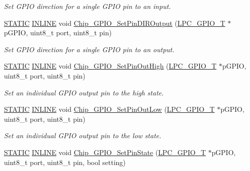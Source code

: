 \begin{DoxyCompactItemize}
\begin{DoxyCompactList}\small\item\em Set G\+P\+IO direction for a single G\+P\+IO pin to an input. \end{DoxyCompactList}\item 
\hyperlink{group__LPC__Types__Public__Macros_ga10b2d890d871e1489bb02b7e70d9bdfb}{S\+T\+A\+T\+IC} \hyperlink{group__LPC__Types__Public__Types_ga2eb6f9e0395b47b8d5e3eeae4fe0c116}{I\+N\+L\+I\+NE} void \hyperlink{group__GPIO__17XX__40XX_gadd0450341df62f7e13ee57cd249fe2a2}{Chip\+\_\+\+G\+P\+I\+O\+\_\+\+Set\+Pin\+D\+I\+R\+Output} (\hyperlink{structLPC__GPIO__T}{L\+P\+C\+\_\+\+G\+P\+I\+O\+\_\+T} $\ast$p\+G\+P\+IO, uint8\+\_\+t port, uint8\+\_\+t pin)
\begin{DoxyCompactList}\small\item\em Set G\+P\+IO direction for a single G\+P\+IO pin to an output. \end{DoxyCompactList}\item 
\hyperlink{group__LPC__Types__Public__Macros_ga10b2d890d871e1489bb02b7e70d9bdfb}{S\+T\+A\+T\+IC} \hyperlink{group__LPC__Types__Public__Types_ga2eb6f9e0395b47b8d5e3eeae4fe0c116}{I\+N\+L\+I\+NE} void \hyperlink{group__GPIO__17XX__40XX_ga1447549f6e88a29b5589326f177d4a96}{Chip\+\_\+\+G\+P\+I\+O\+\_\+\+Set\+Pin\+Out\+High} (\hyperlink{structLPC__GPIO__T}{L\+P\+C\+\_\+\+G\+P\+I\+O\+\_\+T} $\ast$p\+G\+P\+IO, uint8\+\_\+t port, uint8\+\_\+t pin)
\begin{DoxyCompactList}\small\item\em Set an individual G\+P\+IO output pin to the high state. \end{DoxyCompactList}\item 
\hyperlink{group__LPC__Types__Public__Macros_ga10b2d890d871e1489bb02b7e70d9bdfb}{S\+T\+A\+T\+IC} \hyperlink{group__LPC__Types__Public__Types_ga2eb6f9e0395b47b8d5e3eeae4fe0c116}{I\+N\+L\+I\+NE} void \hyperlink{group__GPIO__17XX__40XX_ga0e06760450b8e7a2c71920b06bcd6286}{Chip\+\_\+\+G\+P\+I\+O\+\_\+\+Set\+Pin\+Out\+Low} (\hyperlink{structLPC__GPIO__T}{L\+P\+C\+\_\+\+G\+P\+I\+O\+\_\+T} $\ast$p\+G\+P\+IO, uint8\+\_\+t port, uint8\+\_\+t pin)
\begin{DoxyCompactList}\small\item\em Set an individual G\+P\+IO output pin to the low state. \end{DoxyCompactList}\item 
\hyperlink{group__LPC__Types__Public__Macros_ga10b2d890d871e1489bb02b7e70d9bdfb}{S\+T\+A\+T\+IC} \hyperlink{group__LPC__Types__Public__Types_ga2eb6f9e0395b47b8d5e3eeae4fe0c116}{I\+N\+L\+I\+NE} void \hyperlink{group__GPIO__17XX__40XX_ga2d8db9f0a52f061d64e8cada713ae03e}{Chip\+\_\+\+G\+P\+I\+O\+\_\+\+Set\+Pin\+State} (\hyperlink{structLPC__GPIO__T}{L\+P\+C\+\_\+\+G\+P\+I\+O\+\_\+T} $\ast$p\+G\+P\+IO, uint8\+\_\+t port, uint8\+\_\+t pin, bool setting)

\end{DoxyCompactItemize}
